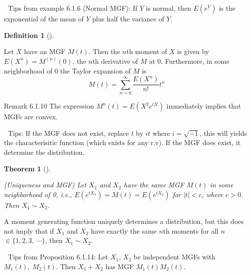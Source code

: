 \documentclass[
  letterpaper,
  DIV=11,
  numbers=noendperiod]{scrreprt}
\theoremstyle{plain}
\newtheorem{theorem}{Theorem}[chapter]
\theoremstyle{definition}
\newtheorem{definition}{Definition}[chapter]
\theoremstyle{remark}
\begin{document}
💌 Tips from example 6.1.6 (Normal MGF): If \(Y\) is normal, then
\(E(e^Y)\) is the exponential of the mean of \(Y\) plus half the
variance of \(Y\).

\leavevmode{}%
\begin{definition}[]\label{def-n-th-moment}

Let \(\displaystyle X\) have an MGF \(\displaystyle M( t)\). Then the
\(\displaystyle n\)th moment of \(\displaystyle X\) is given by
\(\displaystyle E\left( X^{n}\right) =M^{( n)}( 0)\), the
\(\displaystyle n\)th derivative of \(\displaystyle M\) at
\(\displaystyle 0\). Furthermore, in some neighborhood of
\(\displaystyle 0\) the Taylor expansion of \(\displaystyle M\) is
\begin{equation*}
M( t) =\sum _{n=0}^{\infty }\frac{E\left( X^{n}\right)}{n!} t^{n}
\end{equation*}

\end{definition}

Remark 6.1.10 The expression
\(\displaystyle M^{n}( t) =E\left( X^{2} e^{tX}\right)\) immediately
implies that MGFs are convex.

💌 Tips: If the MGF does not exist, replace \(\displaystyle t\) by
\(\displaystyle it\) where \(\displaystyle i=\sqrt{-1}\), this will
yields the characterisitic function (which exists for any r.v). If the
MGF does exist, it determine the distribution.

\leavevmode{}%
\begin{theorem}[]\label{thm-linearity}

(Uniqueness and MGF) Let \(\displaystyle X_{1}\) and
\(\displaystyle X_{2}\) have the same MGF \(\displaystyle M( t)\) in
some neighborhood of 0, i.e.,
\(\displaystyle E\left( e^{tX_{1}}\right) =M( t) =E\left( e^{tX_{2}}\right)\)
for \(\displaystyle |t|< c\), where \(\displaystyle c >0\). Then
\(\displaystyle X_{1} \sim X_{2}\).

\end{theorem}

A moment generating function uniquely determines a distribution, but
this does not imply that if \(\displaystyle X_{1}\) and
\(\displaystyle X_{2}\) have exactly the same \(\displaystyle n\)th
moments for all
\(\displaystyle n\)\(\displaystyle \in \{1,2,3,\ \cdots \}\), then
\(\displaystyle X_{1} \sim X_{2} .\)

💌 Tips from Proposition 6.1.14: Let \(\displaystyle X_{1}\),
\(\displaystyle X_{2}\) be independent MGFs with
\(\displaystyle M_{1}( t) ,\ M_{2}( t)\). Then
\(\displaystyle X_{1} +X_{2}\) has MGF
\(\displaystyle M_{1}( t) M_{2}( t)\).
\end{document}
